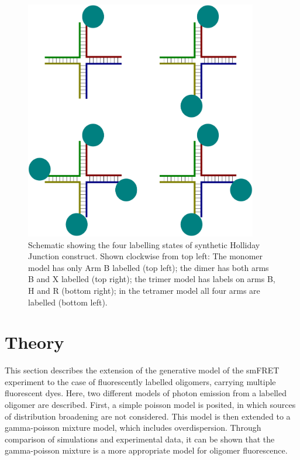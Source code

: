\begin{figure}
   \begin{center}
      \includegraphics*[clip=true, width=4in]{sizing/holliday_junction_labelling.pdf}
      \caption{Schematic showing the four labelling states of synthetic Holliday Junction construct. Shown clockwise from top left: The monomer model has only Arm B labelled (top left); the dimer has both arms B and X labelled (top right); the trimer model has labels on arms B, H and R (bottom right); in the tetramer model all four arms are labelled (bottom left).}
      \label{fig:holliday_junction_labelling}
   \end{center}
\end{figure}

\section{Theory}

This section describes the extension of the generative model of the smFRET experiment to the case of fluorescently labelled oligomers, carrying multiple fluorescent dyes. Here, two different models of photon emission from a labelled oligomer are described. First, a simple poisson model is posited, in which sources of distribution broadening are not considered. This model is then extended to a gamma-poisson mixture model, which includes overdispersion. Through comparison of simulations and experimental data, it can be shown that the gamma-poisson mixture is a more appropriate model for oligomer fluorescence.

